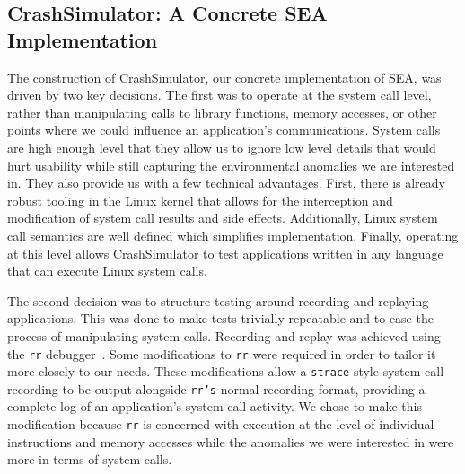 \subsection{CrashSimulator: A Concrete SEA Implementation}
\label{SUBSEC:ApproachCrashSim}
The construction of CrashSimulator,
our concrete implementation of SEA,
was driven by two key decisions.
The first
was to operate at the system call level,
rather than manipulating
calls to library functions, memory accesses, or other points where we could
influence an application's communications.
System calls are high enough level that they allow us
to ignore low level details that would hurt usability while still
capturing the environmental anomalies we are interested in.
They also provide us with a
few technical advantages.
First, there is already robust tooling in the Linux
kernel that allows for the interception and modification of system call
results and side effects.  Additionally, Linux system call semantics are
well defined which simplifies implementation. Finally, operating at this
level allows CrashSimulator to test applications written in any language
that can execute Linux system calls.

The second decision was to structure testing around recording and replaying
applications.  This was done to make tests trivially repeatable and to ease
the process of manipulating system calls.  Recording and replay was
achieved using the {\tt rr} debugger~\cite{rrwebsite}.
Some modifications to {\tt rr} were required in order to
tailor it more closely to our needs.
These modifications allow
a {\tt strace}-style
system call recording to be output alongside {\tt rr's} normal recording
format, providing
a complete log of an application's system call activity.
We chose to make this
modification because {\tt rr} is concerned with execution
at the level of individual instructions and memory accesses while the
anomalies we were interested in were more in terms of
system calls.


